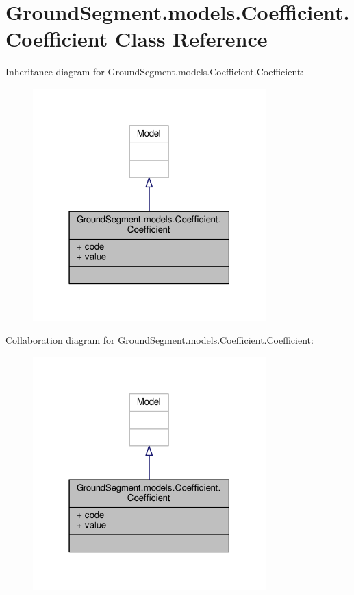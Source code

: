 \hypertarget{class_ground_segment_1_1models_1_1_coefficient_1_1_coefficient}{}\section{Ground\+Segment.\+models.\+Coefficient.\+Coefficient Class Reference}
\label{class_ground_segment_1_1models_1_1_coefficient_1_1_coefficient}


Inheritance diagram for Ground\+Segment.\+models.\+Coefficient.\+Coefficient\+:\nopagebreak
\begin{figure}[H]
\begin{center}
\leavevmode
\includegraphics[width=255pt]{class_ground_segment_1_1models_1_1_coefficient_1_1_coefficient__inherit__graph}
\end{center}
\end{figure}


Collaboration diagram for Ground\+Segment.\+models.\+Coefficient.\+Coefficient\+:\nopagebreak
\begin{figure}[H]
\begin{center}
\leavevmode
\includegraphics[width=255pt]{class_ground_segment_1_1models_1_1_coefficient_1_1_coefficient__coll__graph}
\end{center}
\end{figure}
